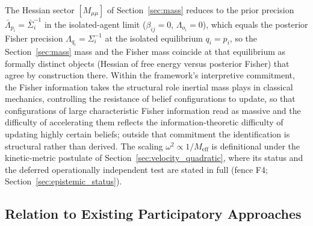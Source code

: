 \documentclass[11pt]{article}
\begin{document}
The Hessian sector $[M_{\mu\mu}]$ of Section~\ref{sec:mass} reduces to the prior precision $\bar{\Lambda}_{p_i} = \bar{\Sigma}_i^{-1}$ in the isolated-agent limit ($\beta_{ij} = 0$, $\Lambda_{o_i} = 0$), which equals the posterior Fisher precision $\Lambda_{q_i} = \Sigma_i^{-1}$ at the isolated equilibrium $q_i = p_i$, so the Section~\ref{sec:mass} mass and the Fisher mass coincide at that equilibrium as formally distinct objects (Hessian of free energy versus posterior Fisher) that agree by construction there. Within the framework's interpretive commitment, the Fisher information takes the structural role inertial mass plays in classical mechanics, controlling the resistance of belief configurations to update, so that configurations of large characteristic Fisher information read as massive and the difficulty of accelerating them reflects the information-theoretic difficulty of updating highly certain beliefs; outside that commitment the identification is structural rather than derived. The scaling $\omega^2 \propto 1/M_{\mathrm{eff}}$ is definitional under the kinetic-metric postulate of Section~\ref{sec:velocity_quadratic}, where its status and the deferred operationally independent test are stated in full (fence F4; Section~\ref{sec:epistemic_status}).

\subsection{Relation to Existing Participatory Approaches}
\end{document}
